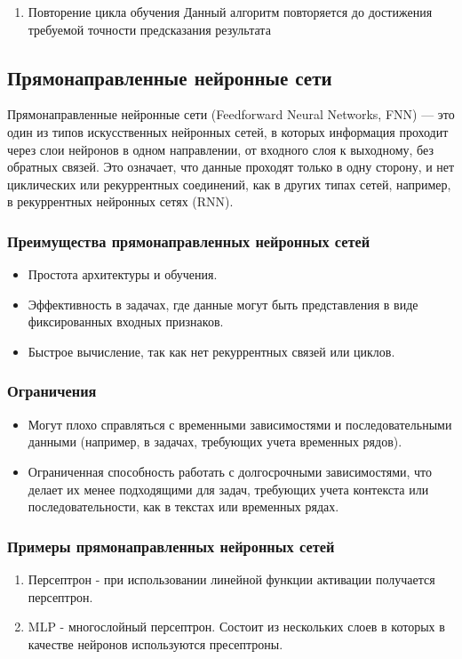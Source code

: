 \begin{enumerate}
\item Повторение цикла обучения
Данный алгоритм повторяется до достижения требуемой точности предсказания результата
\end{enumerate}
\subsection{Прямонаправленные нейронные сети}

Прямонаправленные нейронные сети (Feedforward Neural Networks, FNN) — это один из типов
искусственных нейронных сетей, в которых информация проходит через слои нейронов в одном
направлении, от входного слоя к выходному, без обратных связей. Это означает, что данные проходят
только в одну сторону, и нет циклических или рекуррентных соединений, как в других типах сетей,
например, в рекуррентных нейронных сетях (RNN).
\subsubsection{Преимущества прямонаправленных нейронных сетей}
\begin{itemize}
\item Простота архитектуры и обучения.
\item Эффективность в задачах, где данные могут быть представления в виде фиксированных входных признаков.
\item Быстрое вычисление, так как нет рекуррентных связей или циклов.
\end{itemize}
\subsubsection{Ограничения}
\begin{itemize}
\item Могут плохо справляться с временными зависимостями и последовательными данными (например, в задачах, требующих учета временных рядов).
\item Ограниченная способность работать с долгосрочными зависимостями, что делает их менее подходящими для задач, требующих учета контекста или последовательности, как в текстах или временных рядах.
\end{itemize}
\subsubsection{Примеры прямонаправленных нейронных сетей}
\begin{enumerate}
\item Персептрон - при использовании линейной функции активации получается персептрон.
\item MLP - многослойный персептрон. Состоит из нескольких слоев в которых в качестве нейронов
используются пресептроны.
\end{enumerate}
